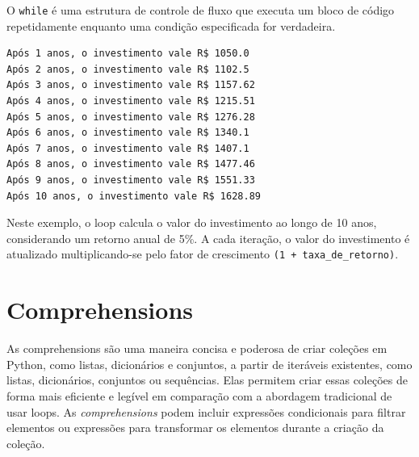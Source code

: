 \documentclass[
  portuguese,
  letterpaper,
  DIV=11,
  numbers=noendperiod]{scrreprt}
\newenvironment{Shaded}{\begin{snugshade}}{\end{snugshade}}
\newcommand{\BuiltInTok}[1]{\textcolor[rgb]{0.00,0.23,0.31}{#1}}
\newcommand{\ControlFlowTok}[1]{\textcolor[rgb]{0.00,0.23,0.31}{\textbf{#1}}}
\newcommand{\DecValTok}[1]{\textcolor[rgb]{0.68,0.00,0.00}{#1}}
\newcommand{\FloatTok}[1]{\textcolor[rgb]{0.68,0.00,0.00}{#1}}
\newcommand{\NormalTok}[1]{\textcolor[rgb]{0.00,0.23,0.31}{#1}}
\newcommand{\OperatorTok}[1]{\textcolor[rgb]{0.37,0.37,0.37}{#1}}
\newcommand{\StringTok}[1]{\textcolor[rgb]{0.13,0.47,0.30}{#1}}
\theoremstyle{definition}
\theoremstyle{remark}
\begin{document}
O \texttt{while} é uma estrutura de controle de fluxo que executa um
bloco de código repetidamente enquanto uma condição especificada for
verdadeira.

\begin{Shaded}
\end{Shaded}

\begin{verbatim}
Após 1 anos, o investimento vale R$ 1050.0
Após 2 anos, o investimento vale R$ 1102.5
Após 3 anos, o investimento vale R$ 1157.62
Após 4 anos, o investimento vale R$ 1215.51
Após 5 anos, o investimento vale R$ 1276.28
Após 6 anos, o investimento vale R$ 1340.1
Após 7 anos, o investimento vale R$ 1407.1
Após 8 anos, o investimento vale R$ 1477.46
Após 9 anos, o investimento vale R$ 1551.33
Após 10 anos, o investimento vale R$ 1628.89
\end{verbatim}

Neste exemplo, o loop calcula o valor do investimento ao longo de 10
anos, considerando um retorno anual de 5\%. A cada iteração, o valor do
investimento é atualizado multiplicando-se pelo fator de crescimento
\texttt{(1\ +\ taxa\_de\_retorno)}.

\section{Comprehensions}\label{comprehensions}

As comprehensions são uma maneira concisa e poderosa de criar coleções
em Python, como listas, dicionários e conjuntos, a partir de iteráveis
existentes, como listas, dicionários, conjuntos ou sequências. Elas
permitem criar essas coleções de forma mais eficiente e legível em
comparação com a abordagem tradicional de usar loops. As
\emph{comprehensions} podem incluir expressões condicionais para filtrar
elementos ou expressões para transformar os elementos durante a criação
da coleção.
\end{document}
